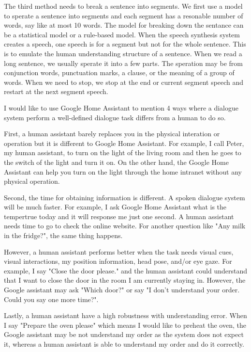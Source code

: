 \documentclass[12pt]{article}
\newenvironment{problem}[2][Problem]{\begin{trivlist}
\item[\hskip \labelsep {\bfseries #1}\hskip \labelsep {\bfseries #2.}]}{\end{trivlist}}
\begin{document}
\begin{problem}{2.3}
    The third method needs to break a sentence into segments. 
    We first use a model to sperate a sentence into segments and each segment has a 
    resonable number of words, say like at most 10 words. 
    The model for breaking down the sentance can be a statistical model or a rule-based model. 
    When the speech synthesis system creates a speech, one speech is for a segment
    but not for the whole sentence. This is to emulate the human understanding 
    structure of a sentence. When we read a long sentence, we usually sperate it
    into a few parts. The speration may be from conjunction words, punctuation marks,
    a clause, or the meaning of a group of words. When we need to stop, we stop
    at the end or current segment speech and restart at the next segment speech.
\end{problem}

\pagebreak
\begin{problem}{3.1}
    I would like to use Google Home Assistant to mention 4 ways where a dialogue
    system perform a well-defined dialogue task differs from a human to do so.

    First, a human assistant barely replaces you in the physical interation or 
    operation but it is different to Google Home Assistant.
    For example, I call Peter, my human assistant, to turn on the light of the 
    living room and then he goes to the switch of the light and turn it on. On 
    the other hand, the Google Home Assistant can help you turn on the light
    through the home intranet without any physical operation. 

    Second, the time for obtaining information is different. A spoken dialogue 
    system will be much faster. For example, I ask Google Home Assistant what
    is the tempertrue today and it will response me just one second. A human 
    assistant needs time to go to check the online website. For another question
    like "Any milk in the fridge?", the same thing happens.

    However, a human assistant performs better when the task needs visual
    cues, visual interactions, my position information, head pose, and/or eye
    gaze. For example, I say "Close the door please." and the human assistant
    could understand that I want to close the door in the room I am currently
    staying in. However, the Google assistant may ask "Which door?" or say
    "I don't understand your order. Could you say one more time?".

    Lastly, a human assistant have a high robustness with understanding error.
    When I say "Prepare the oven please" which means I would like to preheat the 
    oven, the Google assistant may be not understand my order as the system does
    not expect it, whereas a human assistant is able to understand my order and 
    do it correctly.
\end{problem}
\end{document}
